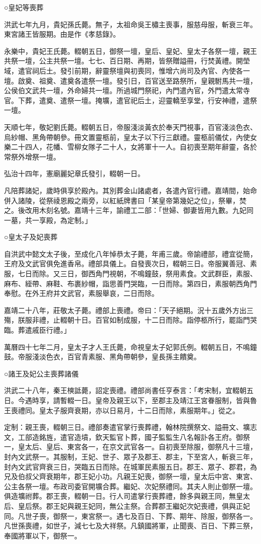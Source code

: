 ○皇妃等喪葬

洪武七年九月，貴妃孫氏薨。無子，太祖命吳王橚主喪事，服慈母服，斬衰三年。東宮諸王皆服期。由是作《孝慈錄》。

永樂中，貴妃王氏薨。輟朝五日，御祭一壇，皇后、皇妃、皇太子各祭一壇，親王共祭一壇，公主共祭一壇。七七、百日期、再期，皆祭贈謚冊，行焚黃禮。開塋域，遣官祠后土。發引前期，辭靈祭壇與初喪同，惟增六尚司及內官、內使各一壇。啟奠、祖奠、遣奠各遣祭一壇。發引日，百官送至路祭所，皇親駙馬共一壇，公侯伯文武共一壇，外命婦共一壇。所過城門祭祀，內門遣內官，外門遣太常寺官。下葬，遣奠、遣祭一壇。掩壙，遣官祀后土，迎靈轎至享堂，行安神禮，遣祭一壇。

天順七年，敬妃劉氏薨。輟朝五日，帝服淺淡黃衣於奉天門視事，百官淺淡色衣、烏紗帽、黑角帶朝參。冊文置靈柩前，皇太子以下行三獻禮。靈柩前儀仗，內使女樂二十四人，花幡、雪柳女隊子二十人，女將軍十一人。自初喪至期年辭靈，各於常祭外增祭一壇。

弘治十四年，憲廟麗妃章氏發引，輟朝一日。

凡陪葬諸妃，歲時俱享於殿內。其別葬金山諸處者，各遣內官行禮。嘉靖間，始命併入諸陵，從祭祾恩殿之兩旁，以紅紙牌書曰「某皇帝第幾妃之位」，祭畢，焚之。後改用木刻名號。嘉靖十三年，諭禮工二部：「世婦、御妻皆用九數。九妃同一墓，共一享殿，為定制。」

○皇太子及妃喪葬

自洪武中懿文太子後，至成化八年悼恭太子薨，年甫三歲。帝諭禮部，禮宜從簡，王府及文武官俱免進香帛。禮部具儀上。自發喪次日，輟朝三日。帝服翼善冠、素服，七日而除。又三日，御西角門視朝，不鳴鐘鼓，祭用素食。文武群臣，素服、麻布、絰帶、麻鞋、布裹紗帽，詣思善門哭臨，一日而除。第四日，素服朝西角門奉慰。在外王府并文武官，素服舉哀，二日而除。

嘉靖二十八年，莊敬太子薨。禮部上喪禮。帝曰：「天子絕期。況十五歲外方出三殤，朕服非禮，止輟朝十日。百官如制成服，十二日而除。詣停柩所行，罷詣門哭臨。葬遣戚臣行禮。」

萬曆四十七年二月，皇太子才人王氏薨，命視皇太子妃郭氏例。輟朝五日，不鳴鐘鼓。帝服淺淡色衣，百官青素服、黑角帶朝參，皇長孫主饋奠。

○諸王及妃公主喪葬諸儀

洪武二十八年，秦王樉詆薨，詔定喪禮。禮部尚書任亨泰言：「考宋制，宜輟朝五日。今遇時享，請暫輟一日。皇帝及親王以下，至郡主及靖江王宮眷服制，皆與魯王喪禮同。皇太子服齊衰期，亦以日易月，十二日而除，素服期年。」從之。

定制：親王喪，輟朝三日。禮部奏遣官掌行喪葬禮，翰林院撰祭文、謚冊文、壙志文，工部造銘旌，遣官造墳，欽天監官卜葬，國子監監生八名報訃各王府。御祭一，皇太后、皇后、東宮各一，在京文武官各一。自初喪至除服，御祭凡十三壇，封內文武祭一。其服制，王妃、世子、眾子及郡王、郡主，下至宮人，斬衰三年，封內文武官齊衰三日，哭臨五日而除。在城軍民素服五日。郡王、眾子、郡君，為兄及伯叔父齊衰期年，郡王妃小功。凡親王妃喪，御祭一壇，皇太后中宮、東宮、公主各祭一壇。布政司委官開壙合葬。繼妃、次妃祭禮同。其夫人則止御祭一壇。俱造壙祔葬。郡王喪，輟朝一日。行人司遣掌行喪葬禮，餘多與親王同，無皇太后、皇后祭。郡王妃與親王妃同，無公主祭。合葬郡王繼妃次妃喪禮，俱與正妃同。凡世子喪，御祭一，東宮祭一。遇七及百日、下葬、期年、除服，御祭各一。凡世孫喪禮，如世子，減七七及大祥祭。凡鎮國將軍，止聞喪、百日、下葬三祭，奉國將軍以下，御祭一。

